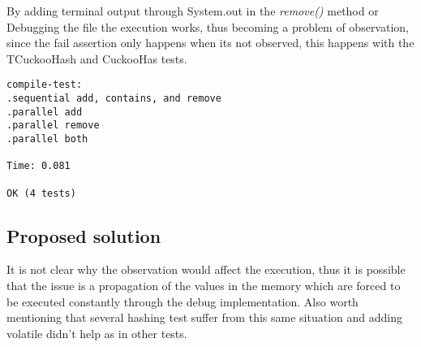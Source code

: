 \par
By adding terminal output through System.out in the \textit{remove()} method or Debugging the file the execution works, thus becoming a problem of observation, since the fail assertion only happens when its not observed, this happens with the TCuckooHash and CuckooHas tests.
\begin{lstlisting}[frame=single,breaklines=true]
compile-test:
.sequential add, contains, and remove
.parallel add
.parallel remove
.parallel both

Time: 0.081

OK (4 tests)
\end{lstlisting}




\subsection{Proposed solution}
\par
It is not clear why the observation would affect the execution, thus it is possible that the issue is a propagation of the values in the memory which are forced to be executed constantly through the debug implementation. Also worth mentioning that several hashing test suffer from this same situation and adding volatile didn't help as in other tests.

